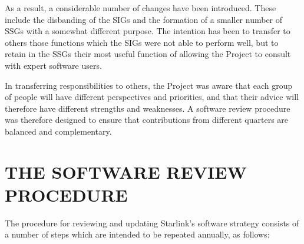 \documentclass[twoside,11pt]{article}
\newcommand{\htmlref}[2]{#1}
\newcommand{\xlabel}[1]{}
\begin{document}
As a result, a considerable number of changes have been introduced.
These include the disbanding of the SIGs and the formation of a
smaller number of SSGs with a somewhat \htmlref{different
purpose}{sect:comparison}. The intention has been to transfer to
others those functions which the SIGs were not able to perform well,
but to retain in the SSGs their most useful function of allowing the
Project to consult with expert software users.

In transferring responsibilities to others, the Project was aware that
each group of people will have different perspectives and priorities,
and that their advice will therefore have different strengths and
weaknesses. A software review \htmlref{procedure}{sect:procedure} was
therefore designed to ensure that contributions from different
quarters are balanced and complementary.

\section{\xlabel{review_procedure}\label{sect:procedure}THE SOFTWARE REVIEW PROCEDURE}

The procedure for reviewing and updating Starlink's software strategy
consists of a number of steps which are intended to be repeated
annually, as follows:
\end{document}
